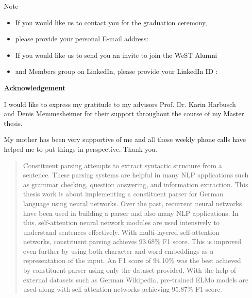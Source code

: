 \documentclass[a4paper, 11pt]{article}
\begin{document}

\vspace{2em}
        \begin{flushleft}
        	\begin{Large}
                	Note
              \\[5mm]
        	\end{Large}
            \begin{itemize}
            	\item If you would like us to contact you for the graduation ceremony, 
                \item[] please provide your personal E-mail address: \dotfill
                \item If you would like us to send you an invite to join the WeST Alumni 
                \item[] and Members group on LinkedIn, please provide your LinkedIn ID : \dotfill
            \end{itemize}
            \cleardoublepage%
        \end{flushleft}
\pagebreak      

  \begin{center}
  \begin{large}
  \bfseries{Acknowledgement}
  \end{large}
  \end{center}
I would like to express my gratitude to my advisors Prof. Dr. Karin Harbusch and Denis Memmesheimer for their support throughout the course of my Master thesis. 

My mother has been very supportive of me and all those weekly phone calls have helped me to put things in perspective. Thank you.
  \cleardoublepage%
\pagebreak        


\begin{abstract}

Constituent parsing attempts to extract syntactic structure from a sentence. These parsing systems are helpful in many NLP applications such as grammar checking, question answering, and information extraction. This thesis work is about implementing a constituent parser for German language using neural networks. Over the past, recurrent neural networks have been used in building a parser and also many NLP applications. In this, self-attention neural network modules are used intensively to understand sentences effectively. With multi-layered self-attention networks, constituent parsing achieves 93.68\% F1 score. This is improved even further by using both character and word embeddings as a representation of the input. An F1 score of 94.10\% was the best achieved by constituent parser using only the dataset provided. With the help of external datasets such as German Wikipedia, pre-trained ELMo models are used along with self-attention networks achieving 95.87\% F1 score. 
\end{abstract}
\pagebreak
\end{document}
